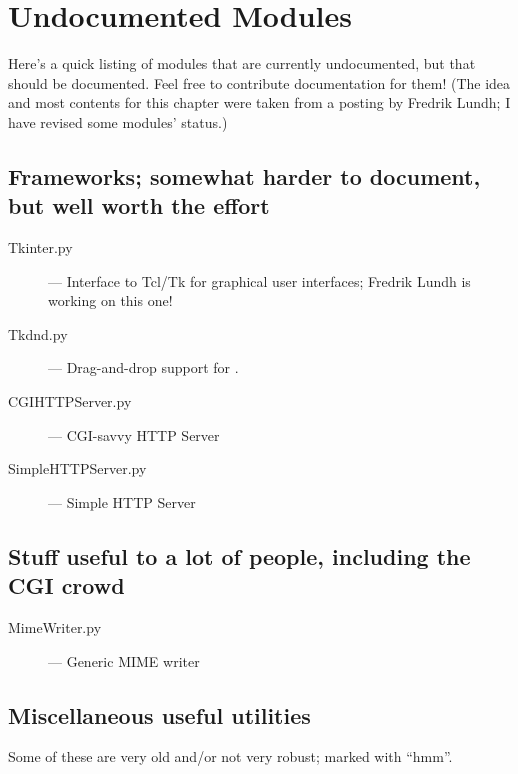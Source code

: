 \chapter{Undocumented Modules}
\label{undoc}

Here's a quick listing of modules that are currently undocumented, but
that should be documented.  Feel free to contribute documentation for
them!  (The idea and most contents for this chapter were taken from a
posting by Fredrik Lundh; I have revised some modules' status.)


\section{Frameworks; somewhat harder to document, but well worth the effort}

\begin{description}
\item[Tkinter.py]
--- Interface to Tcl/Tk for graphical user interfaces;
Fredrik Lundh is working on this one!

\item[Tkdnd.py]
--- Drag-and-drop support for .

\item[CGIHTTPServer.py]
--- CGI-savvy HTTP Server

\item[SimpleHTTPServer.py]
--- Simple HTTP Server
\end{description}


\section{Stuff useful to a lot of people, including the CGI crowd}

\begin{description}
\item[MimeWriter.py]
--- Generic MIME writer
\end{description}


\section{Miscellaneous useful utilities}

Some of these are very old and/or not very robust; marked with ``hmm''.

